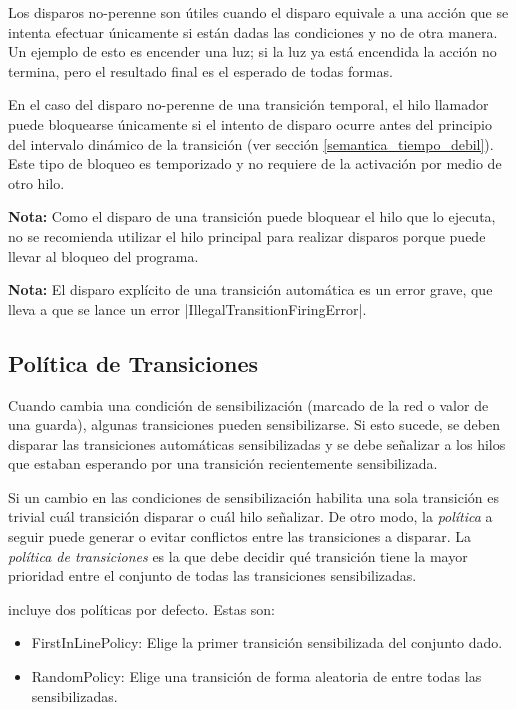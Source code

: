 Los disparos no-perenne son útiles cuando el disparo equivale a una acción que
se intenta efectuar únicamente si están dadas las condiciones y no de otra
manera. Un ejemplo de esto es encender una luz; si la luz ya está encendida la
acción no termina, pero el resultado final es el esperado de todas formas.

En el caso del disparo no-perenne de una transición temporal, el hilo
llamador puede bloquearse únicamente si el intento de disparo ocurre antes del
principio del intervalo dinámico de la transición (ver sección
\ref{semantica_tiempo_debil}). Este tipo de bloqueo es temporizado y no requiere
de la activación por medio de otro hilo.

\begin{framed}
\textbf{Nota:} Como el disparo de una transición puede bloquear el hilo que lo
ejecuta, no se recomienda utilizar el hilo principal para realizar disparos
porque puede llevar al bloqueo del programa.
\end{framed}

\begin{framed}
\textbf{Nota:} El disparo explícito de una transición automática es un error
grave, que lleva a que se lance un error
|IllegalTransitionFiringError|.
\end{framed}

\subsection{Política de Transiciones}
\label{sec:politica_transiciones}
Cuando cambia una condición de sensibilización (marcado de la red o valor de
una guarda), algunas transiciones pueden sensibilizarse. Si esto sucede, se
deben disparar las transiciones automáticas sensibilizadas y se debe señalizar a
los hilos que estaban esperando por una transición recientemente sensibilizada.

Si un cambio en las condiciones de sensibilización habilita una sola
transición es trivial cuál transición disparar o cuál hilo señalizar. De otro
modo, la \textit{política} a seguir puede generar o evitar conflictos entre las
transiciones a disparar.
La \textit{política de transiciones} es la que debe decidir qué transición tiene
la mayor prioridad entre el conjunto de todas las transiciones sensibilizadas.

\javapetriconcurrencymonitor incluye dos políticas por defecto. Estas son:
\begin{itemize}
    \item FirstInLinePolicy: Elige la primer transición sensibilizada del
    conjunto dado.
    \item RandomPolicy: Elige una transición de forma aleatoria de entre todas
    las sensibilizadas.
\end{itemize}

